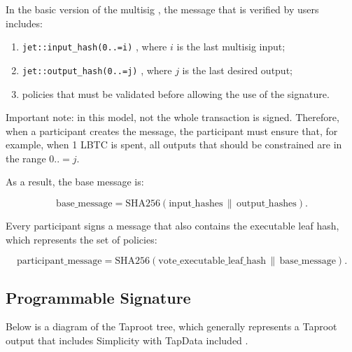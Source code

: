 \documentclass[11pt]{article}
\begin{document}
In the basic version of the multisig \cite{native-multisig-multisig}, the message that is verified by users includes:

\begin{enumerate}
\item \texttt{jet::input\_hash(0..=i)} \cite{simplicity-input-hash}, where $i$ is the last multisig input;
\item \texttt{jet::output\_hash(0..=j)} \cite{simplicity-output-hash}, where $j$ is the last desired output;
\item policies that must be validated before allowing the use of the signature.
\end{enumerate}

Important note: in this model, not the whole transaction is signed.
Therefore, when a participant creates the message, the participant must ensure that, for example, when 1 LBTC is spent, all outputs that should be constrained are in the range $0..=j$.

As a result, the base message is:

\begin{equation}
\mathrm{base\_message}
  =
\mathrm{SHA256}(
  \mathrm{input\_hashes}
  \,\|\,
  \mathrm{output\_hashes}
).
\end{equation}

Every participant signs a message that also contains the executable leaf hash, which represents the set of policies:

\begin{equation}
\mathrm{participant\_message}
  =
\mathrm{SHA256}(
  \mathrm{vote\_executable\_leaf\_hash}
  \,\|\,
  \mathrm{base\_message}
).
\end{equation}

\subsection{Programmable Signature}

Below is a diagram of the Taproot tree, which generally represents a Taproot output that includes Simplicity with TapData included \cite{bip341,simplicity-state}.
\end{document}
